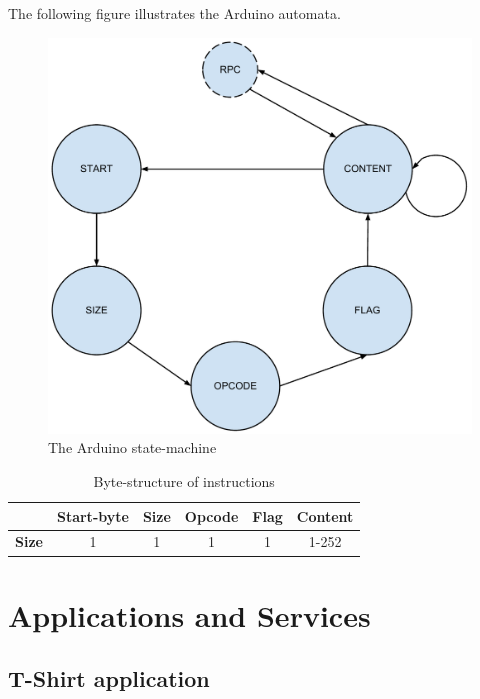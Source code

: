 The following figure illustrates the Arduino automata.

\begin{figure}[h!]
	\centering
	\includegraphics[width=\textwidth, keepaspectratio]{img/arduino_state-machine.pdf}
	\caption{The Arduino state-machine}
	\label{fig:arduino_states}
\end{figure}

\begin{table}
	\begin{tabular}{c|c|c|c|c|c|}
		\cline{2-6}
		& \textbf{Start-byte} & \textbf{Size} & \textbf{Opcode} & \textbf{Flag} & \textbf{Content} \\
		\hline
		\multicolumn{1}{|c|}{\textbf{Size}} & 1 & 1 & 1 & 1 & 1-252 \\
		\hline
	\end{tabular}
	\caption{Byte-structure of instructions}
	\label{tbl:instr_struct}
\end{table}


\section{Applications and Services}

\subsection{T-Shirt application}

